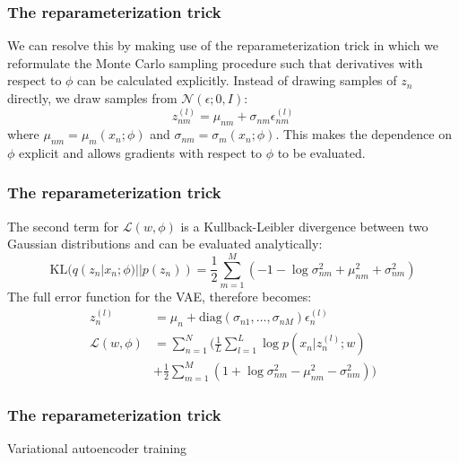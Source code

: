 \documentclass{beamer}
\begin{document}
\begin{frame}
    \frametitle{The reparameterization trick}
    We can resolve this by making use of the reparameterization trick in which we reformulate the Monte Carlo sampling procedure such that derivatives with respect to $\phi$ can be calculated explicitly. Instead of drawing samples of $z_{n}$ directly, we draw samples from $\mathcal{N}(\epsilon;0,I)$:
    \begin{equation*}
        z_{nm}^{(l)}=\mu_{nm}+\sigma_{nm}\epsilon_{nm}^{(l)}
    \end{equation*}
    where $\mu_{nm}=\mu_{m}(x_{n};\phi)$ and $\sigma_{nm}=\sigma_{m}(x_{n};\phi)$. This makes the dependence on $\phi$ explicit and allows gradients with respect to $\phi$ to be evaluated.
\end{frame}

\begin{frame}
    \frametitle{The reparameterization trick}
    The second term for $\mathcal{L}(w,\phi)$ is a Kullback-Leibler divergence between two Gaussian distributions and can be evaluated analytically:
    \begin{equation*}
        \mathrm{KL}(q(z_{n}|x_{n};\phi)||p(z_{n}))=\frac{1}{2}\sum_{m=1}^{M}(-1-\log\sigma^{2}_{nm}+\mu_{nm}^{2}+\sigma^{2}_{nm})
    \end{equation*}
    The full error function for the VAE, therefore becomes:
    \begin{align*}
        z_{n}^{(l)}&=\mu_{n}+\mathrm{diag}(\sigma_{n1},\hdots,\sigma_{nM})\epsilon_{n}^{(l)} \\
        \mathcal{L}(w,\phi)&=\sum_{n=1}^{N}(\frac{1}{L}\sum_{l=1}^{L}\log{}p(x_{n}|z_{n}^{(l)};w) \\
        &+\frac{1}{2}\sum_{m=1}^{M}(1+\log\sigma^{2}_{nm}-\mu_{nm}^{2}-\sigma^{2}_{nm}))
    \end{align*}
\end{frame}

\begin{frame}
    \frametitle{The reparameterization trick}
    \begin{algorithm}[H]
        \caption{Variational autoencoder training}
        \;
    \end{algorithm}
\end{frame}
\end{document}
